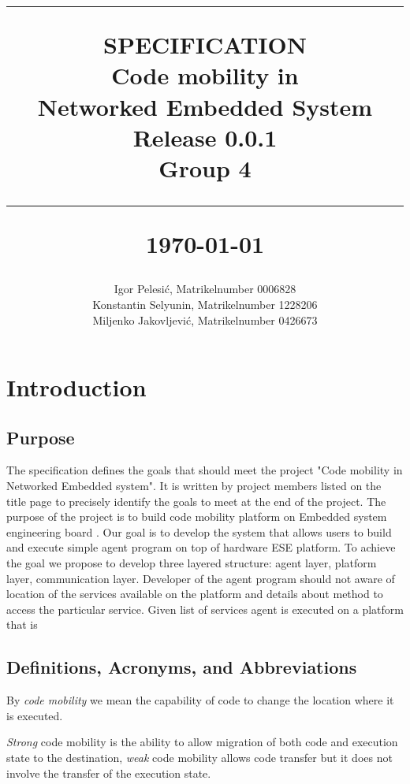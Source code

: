 \documentclass{scrreprt}
\title{%
\flushright
\rule{16cm}{2pt}\vskip1cm
\Huge{SPECIFICATION}\\
\vspace{1cm}
Code mobility in \\Networked Embedded System\\
\vspace{1cm}
\LARGE{Release 0.0.1\\}
\vspace{1cm}
Group 4\\
\vspace{1cm}
\author{Igor Pelesi\'c, Matrikelnumber 0006828\\
Konstantin Selyunin, Matrikelnumber 1228206\\
Miljenko Jakovljevi\'c, Matrikelnumber 0426673 }
\vfill
\rule{16cm}{2pt}\vskip1cm
\date{}
\today
}
\begin{document}
\maketitle
\tableofcontents

\clearpage

\chapter{Introduction}

	\section{Purpose}

The specification defines the goals that should meet the project "Code mobility in Networked Embedded system". It is written by project members listed on the title page to precisely identify the goals to meet at the end of the project.
\vspace{0.1in}
\noindent
The purpose of the project is to build code mobility platform on Embedded system engineering board \cite{galler}. Our goal is to develop the system that allows users to build and execute simple agent program on top of  hardware ESE platform. To achieve the goal we propose to develop three layered structure: agent layer, platform layer, communication layer. Developer of the agent program should not aware of location of the services available on the platform and details about method to access the particular service. Given list of services agent is executed on a platform that is


	\section{Definitions, Acronyms, and Abbreviations}

By \emph{code mobility} we mean the capability of code to change the location where it is executed.

\vspace{0.1in}
\noindent
\emph{Strong} code mobility is the ability to allow migration of both code and execution state to the destination, \emph{weak} code mobility allows code transfer but it does not involve the transfer of the execution state.
\end{document}
